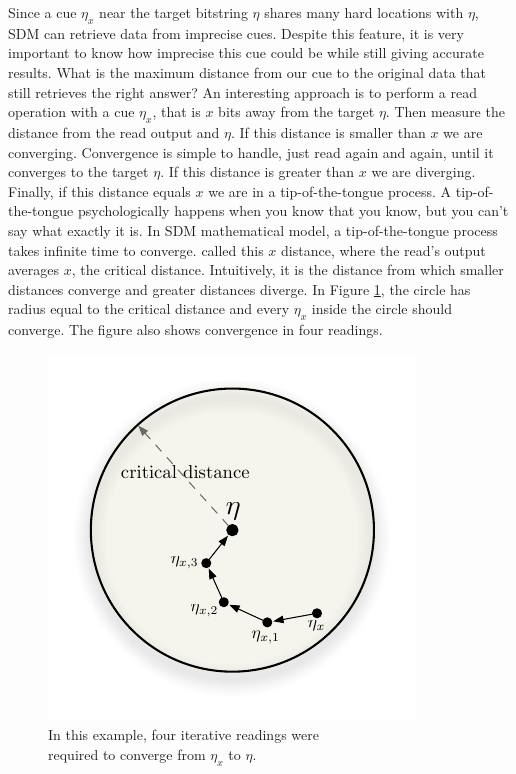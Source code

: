 Since a cue $\eta_{x}$ near the target bitstring $\eta$ shares many hard locations with $\eta$, SDM can retrieve data from imprecise cues. Despite this feature, it is very important to know how imprecise this cue could be while still giving accurate results. What is the maximum distance from our cue to the original data that still retrieves the right answer? An interesting approach is to perform a read operation with a cue $\eta_{x}$, that is $x$ bits away from the target $\eta$.  Then measure the distance from the read output and $\eta$. If this distance is smaller than $x$ we are converging. Convergence is simple to handle, just read again and again, until it converges to the target $\eta$. If this distance is greater than $x$ we are diverging. Finally, if this distance equals $x$ we are in a tip-of-the-tongue process.  A tip-of-the-tongue psychologically happens when you know that you know, but you can't say what exactly it is. In SDM mathematical model, a tip-of-the-tongue process takes infinite time to converge. \citet{Kanerva1988} called this $x$ distance, where the read's output averages $x$, the critical distance. Intuitively, it is the distance from which smaller distances converge and greater distances diverge. In Figure \ref{fig-p1-p2-iterative-read}, the circle has radius equal to the critical distance and every $\eta_{x}$ inside the circle should converge.  The figure also shows convergence in four readings.

\begin{figure}[!htb]
\centering\includegraphics[scale=0.75]{./images02/p1_p2_iter_read.pdf}

\caption{In this example, four iterative readings were\protect \\
required to converge from $\eta_{x}$ to $\eta$.\label{fig-p1-p2-iterative-read}}
\end{figure}


